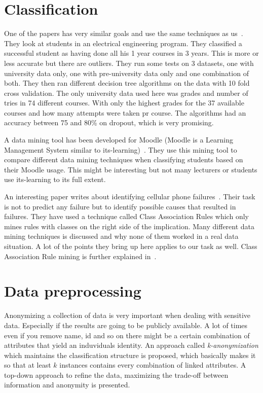 \section{Classification}
One of the papers has very similar goals and use the same techniques as us~\cite{7}.
They look at students in an electrical engineering program. 
They classified a successful student as having done all his 1 year courses in 3 years. 
This is more or less accurate but there are outliers. 
They run some tests on 3 datasets, one with university data only, one with pre-university data only and one combination of both. 
They then ran different decision tree algorithms on the data with 10 fold cross validation. 
The only university data used here was grades and number of tries in 74 different courses. 
With only the highest grades for the 37 available courses and how many attempts were taken pr course.
The algorithms had an accuracy between 75 and 80\% on dropout, which is very promising.

\bigskip\noindent
A data mining tool has been developed for Moodle (Moodle is a Learning Management System similar to its-learning)~\cite{12}.
They use this mining tool to compare different data mining techniques when classifying students based on their Moodle usage. 
This might be interesting but not many lecturers or students use its-learning to its full extent. 

\bigskip\noindent
An interesting paper writes about identifying cellular phone failures~\cite{3}.
Their task is not to predict any failure but to identify possible causes that resulted in failures.  
They have used a technique called Class Association Rules which only mines rules with classes on the right side of the implication. 
Many different data mining techniques is discussed and why none of them worked in a real data situation. 
A lot of the points they bring up here applies to our task as well.
Class Association Rule mining is further explained in~\cite{4}.

\section{Data preprocessing}
Anonymizing a collection of data is very important when dealing with sensitive data. 
Especially if the results are going to be publicly available. 
A lot of times even if you remove name, id and so on there might be a certain combination of attributes that yield an induviduals identity.
An approach called \textit{k-anonymization} which maintains the classification structure is proposed, 
which basically makes it so that at least $k$ instances contains every combination of linked attributes. 
A top-down approach to refine the data, maximizing the trade-off between information and anonymity is presented.~\cite{14}

